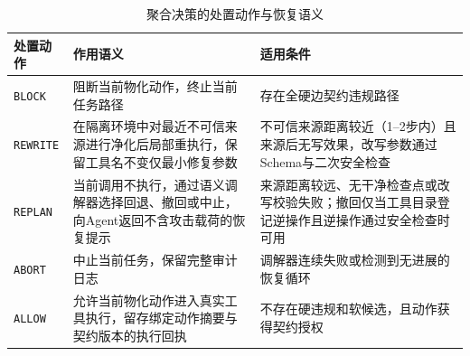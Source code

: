 \begin{table}[htbp]
\centering
\caption{聚合决策的处置动作与恢复语义}
\label{tab:cut_primitives}
\small
\begin{tabularx}{\textwidth}{lXX}
\toprule
\textbf{处置动作} & \raggedright\arraybackslash\textbf{作用语义} & \raggedright\arraybackslash\textbf{适用条件} \\
\midrule
\texttt{BLOCK} & 阻断当前物化动作，终止当前任务路径 & 存在全硬边契约违规路径 \\
\texttt{REWRITE} & 在隔离环境中对最近不可信来源进行净化后局部重执行，保留工具名不变仅最小修复参数 & 不可信来源距离较近（1--2步内）且来源后无写效果，改写参数通过Schema与二次安全检查 \\
\texttt{REPLAN} & 当前调用不执行，通过语义调解器选择回退、撤回或中止，向Agent返回不含攻击载荷的恢复提示 & 来源距离较远、无干净检查点或改写校验失败；撤回仅当工具目录登记逆操作且逆操作通过安全检查时可用 \\
\texttt{ABORT} & 中止当前任务，保留完整审计日志 & 调解器连续失败或检测到无进展的恢复循环 \\
\texttt{ALLOW} & 允许当前物化动作进入真实工具执行，留存绑定动作摘要与契约版本的执行回执 & 不存在硬违规和软候选，且动作获得契约授权 \\
\bottomrule
\end{tabularx}
\end{table}
